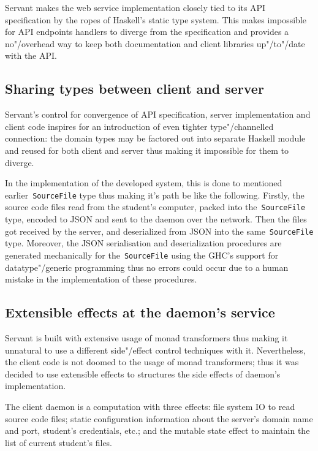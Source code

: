 Servant makes the web service implementation closely tied to its API specification
by the ropes of Haskell's static type system. This makes impossible for API endpoints
handlers to diverge from the specification and provides a no"/overhead way to
keep both documentation and client libraries up"/to"/date with the API.

\subsection{Sharing types between client and server}

Servant's control for convergence of API specification, server implementation and
client code inspires for an introduction of even tighter type"/channelled connection:
the domain types may be factored out into separate Haskell module and reused for
both client and server thus making it impossible for them to diverge.

In the implementation of the developed system, this is done to mentioned
earlier~\lstinline{SourceFile} type thus making it's path be like the following.
Firstly, the source code files read from the student's computer, packed into
the~\lstinline{SourceFile} type, encoded to JSON and sent to the daemon
over the network. Then the files got received by the server, and deserialized from JSON into the
same~\lstinline{SourceFile} type. Moreover, the JSON serialisation and
deserialization procedures are generated mechanically for the~\lstinline{SourceFile}
using the GHC's support for datatype"/generic
programming thus no errors could occur due to a human mistake in the implementation of these
procedures.

\subsection{Extensible effects at the daemon's service}

Servant is built with extensive usage of monad transformers thus making it
unnatural to use a different side"/effect control techniques with it. Nevertheless,
the client code is not doomed to the usage of monad transformers; thus it was decided
to use extensible effects to structures the side effects of daemon's implementation.

The client daemon is a computation with three effects: file system IO to read source
code files; static configuration information about the server's domain name and port,
student's credentials, etc.; and the mutable state effect to maintain the list of current
student's files.

